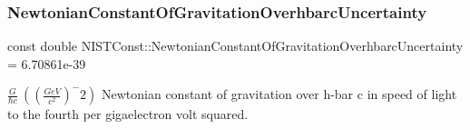 \subsubsection{\texorpdfstring{Newtonian\+Constant\+Of\+Gravitation\+Overhbarc\+Uncertainty}{NewtonianConstantOfGravitationOverhbarcUncertainty}}
{\footnotesize\ttfamily const double N\+I\+S\+T\+Const\+::\+Newtonian\+Constant\+Of\+Gravitation\+Overhbarc\+Uncertainty = 6.\+70861e-\/39}

$\frac{G}{\hbar c} \ ((\frac{GeV}{c^2})^-2)$ Newtonian constant of gravitation over h-\/bar c in speed of light to the fourth per gigaelectron volt squared. 
